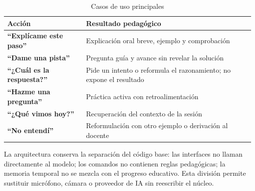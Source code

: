 \documentclass[11pt]{article}
\newcommand{\Section}[1]{\par\vspace{0.16\baselineskip}{\normalfont\normalsize\bfseries\RaggedRight #1\par}}
\begin{document}
\begin{table}[H]
\centering
\caption{Casos de uso principales}
\begin{tabularx}{\textwidth}{@{}>{\raggedright\arraybackslash\bfseries}p{1.65in}X@{}}
\toprule
Acción & Resultado pedagógico \\
\midrule
``Explícame este paso'' & Explicación oral breve, ejemplo y comprobación \\
``Dame una pista'' & Pregunta guía y avance sin revelar la solución \\
``¿Cuál es la respuesta?'' & Pide un intento o reformula el razonamiento; no expone el resultado \\
``Hazme una pregunta'' & Práctica activa con retroalimentación \\
``¿Qué vimos hoy?'' & Recuperación del contexto de la sesión \\
``No entendí'' & Reformulación con otro ejemplo o derivación al docente \\
\bottomrule
\end{tabularx}
\end{table}

\clearpage

\Section{Arquitectura del sistema}

La arquitectura conserva la separación del código base: las interfaces no llaman directamente al modelo; los comandos no contienen reglas pedagógicas; la memoria temporal no se mezcla con el progreso educativo. Esta división permite sustituir micrófono, cámara o proveedor de IA sin reescribir el núcleo.
\end{document}
